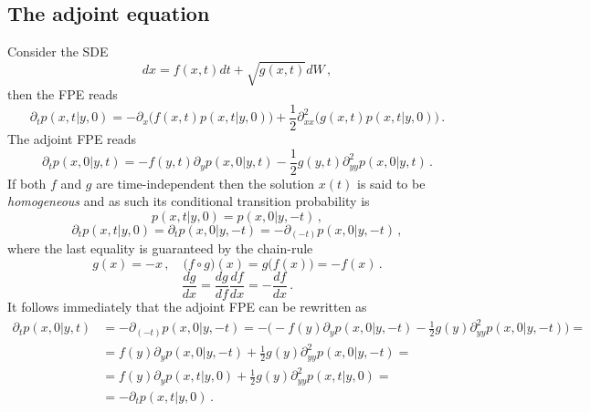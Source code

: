 \documentclass[../main.tex]{subfiles}
\begin{document}
\subsection{The adjoint equation}\label{subsec3.1}
Consider the SDE \cite[Sub-section 4.3.1, p.93]{Gardiner03}
\begin{equation*}
        dx = f(x,t)dt + \sqrt{g(x,t)}dW\,,
\end{equation*}
then the FPE \cite[Sub-section 4.3.4, p.96]{Gardiner03} reads
\begin{equation*}
     \partial_{t}p(x,t|y,0) = -\partial_{x}\big(f(x,t)p(x,t|y,0)\big)+\frac{1}{2}\partial_{xx}^{2}\big(g(x,t)p(x,t|y,0)\big)\,.
\end{equation*}
The adjoint FPE \cite[Section 3.6, p.55]{Gardiner03} reads
\begin{equation*}
     \partial_{t}p(x,0|y,t) = -f(y,t)\partial_{y}p(x,0|y,t)-\frac{1}{2}g(y,t)\partial_{yy}^{2}p(x,0|y,t)\,.
\end{equation*}
If both $f$ and $g$ are time-independent then the solution $x(t)$ is said to be \textit{homogeneous} \cite[Section 3.7, p.56]{Gardiner03} and as such its conditional transition probability is
\begin{equation*}
     p(x,t|y,0) = p(x,0|y,-t)\,,
\end{equation*}
\begin{equation*}
     \partial_{t}p(x,t|y,0)=\partial_{t}p(x,0|y,-t)=-\partial_{(-t)}p(x,0|y,-t)\,,
\end{equation*}
where the last equality is guaranteed by the chain-rule
\begin{equation*}
     g(x)=-x\,,\quad \big(f\circ g\big)(x) = g\big(f(x)\big) = -f(x)\,.
\end{equation*}
\begin{equation*}
     \frac{dg}{dx} = \frac{dg}{df}\frac{df}{dx} = -\frac{df}{dx}\,.
\end{equation*}
It follows immediately that the adjoint FPE can be rewritten as 
\begin{align*}
        \partial_{t}p(x,0|y,t) &= -\partial_{(-t)}p(x,0|y,-t) = -\Big(-f(y)\partial_{y}p(x,0|y,-t)-\frac{1}{2}g(y)\partial_{yy}^{2}p(x,0|y,-t)\Big) = \nonumber \\ 
                                     &=  f(y)\partial_{y}p(x,0|y,-t)+\frac{1}{2}g(y)\partial_{yy}^{2}p(x,0|y,-t) = \nonumber \\
                                     &=  f(y)\partial_{y}p(x,t|y,0)+\frac{1}{2}g(y)\partial_{yy}^{2}p(x,t|y,0) = \nonumber \\
                                     &= -\partial_{t}p(x,t|y,0) \,.
\end{align*}
\end{document}

